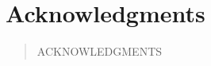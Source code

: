 \ifx\master\undefined\fi

\prelimheaders

\chapter*{Acknowledgments}

\begin{quote}
ACKNOWLEDGMENTS
\end{quote}

\ifx\master\undefined\fi
